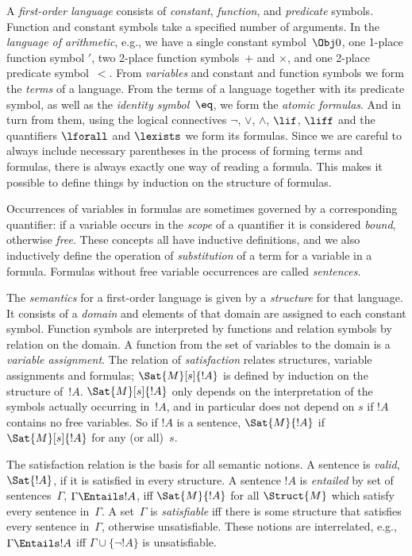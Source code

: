 A \emph{first-order language} consists of \emph{constant},
\emph{function}, and \emph{predicate} symbols. Function and constant
symbols take a specified number of arguments.  In the \emph{language
  of arithmetic}, e.g., we have a single constant symbol~$\Obj 0$, one
1-place function symbol $\prime$, two 2-place function symbols~$+$ and
$\times$, and one 2-place predicate symbol~$<$. From \emph{variables}
and constant and function symbols we form the \emph{terms} of a
language. From the terms of a language together with its predicate
symbol, as well as the \emph{identity symbol}~$\eq$, we form the
  \emph{atomic formulas}. And in turn from them, using the logical
  connectives $\lnot$, $\lor$, $\land$, $\lif$, $\liff$ and the
  quantifiers $\lforall$ and $\lexists$ we form its formulas.  Since
  we are careful to always include necessary parentheses in the
  process of forming terms and formulas, there is always exactly one
  way of reading a formula. This makes it possible to define things by
  induction on the structure of formulas.

Occurrences of variables in formulas are sometimes governed by a
corresponding quantifier: if a variable occurs in the \emph{scope} of
a quantifier it is considered \emph{bound}, otherwise
\emph{free}. These concepts all have inductive definitions, and we
also inductively define the operation of \emph{substitution} of a term
for a variable in a formula. Formulas without free variable
occurrences are called \emph{sentences}.

The \emph{semantics} for a first-order language is given by a
\emph{structure} for that language. It consists of a \emph{domain} and
elements of that domain are assigned to each constant symbol. Function
symbols are interpreted by functions and relation symbols by relation
on the domain.  A function from the set of variables to the domain is
a \emph{variable assignment}. The relation of \emph{satisfaction}
relates structures, variable assignments and formulas;
$\Sat{M}[s]{!A}$ is defined by induction on the structure of~$!A$.
$\Sat{M}[s]{!A}$ only depends on the interpretation of the symbols
actually occurring in~$!A$, and in particular does not depend on $s$
if $!A$ contains no free variables.  So if $!A$ is a sentence,
$\Sat{M}{!A}$ if $\Sat{M}[s]{!A}$ for any (or all)~$s$.

The satisfaction relation is the basis for all semantic notions. A
sentence is \emph{valid}, $\Sat{!A}$, if it is satisfied in every
structure. A sentence $!A$ is \emph{entailed} by set of
sentences~$\Gamma$, $\Gamma \Entails !A$, iff $\Sat{M}{!A}$ for all
$\Struct{M}$ which satisfy every sentence in~$\Gamma$. A set~$\Gamma$
is \emph{satisfiable} iff there is some structure that satisfies every
sentence in~$\Gamma$, otherwise unsatisfiable. These notions are
interrelated, e.g., $\Gamma \Entails !A$ iff $\Gamma \cup \{\lnot
!A\}$ is unsatisfiable.
